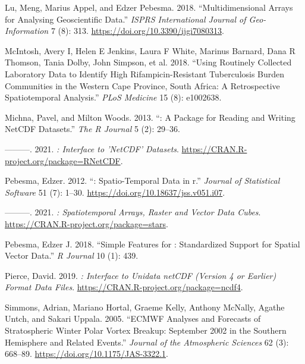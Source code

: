 \documentclass{article}
\newlength{\cslhangindent}
\newlength{\cslentryspacingunit} %
\newenvironment{CSLReferences}[2] %
 {%
  \setlength{\parindent}{0pt}
  \ifodd #1
  \let\oldpar\par
  \def\par{\hangindent=\cslhangindent\oldpar}
  \fi
  \setlength{\parskip}{#2\cslentryspacingunit}
 }%
 {}
\begin{document}
\begin{CSLReferences}{1}{0}
\leavevmode{}%
Lu, Meng, Marius Appel, and Edzer Pebesma. 2018. {``Multidimensional {Arrays} for {Analysing} {Geoscientific} {Data}.''} \emph{ISPRS International Journal of Geo-Information} 7 (8): 313. \url{https://doi.org/10.3390/ijgi7080313}.

\leavevmode{}%
McIntosh, Avery I, Helen E Jenkins, Laura F White, Marinus Barnard, Dana R Thomson, Tania Dolby, John Simpson, et al. 2018. {``Using Routinely Collected Laboratory Data to Identify High Rifampicin-Resistant Tuberculosis Burden Communities in the Western Cape Province, South Africa: A Retrospective Spatiotemporal Analysis.''} \emph{PLoS Medicine} 15 (8): e1002638.

\leavevmode{}%
Michna, Pavel, and Milton Woods. 2013. {``: A Package for Reading and Writing NetCDF Datasets.''} \emph{The R Journal} 5 (2): 29--36.

\leavevmode{}%
---------. 2021. \emph{: Interface to 'NetCDF' Datasets}. \url{https://CRAN.R-project.org/package=RNetCDF}.

\leavevmode{}%
Pebesma, Edzer. 2012. {``: Spatio-Temporal Data in r.''} \emph{Journal of Statistical Software} 51 (7): 1--30. \url{https://doi.org/10.18637/jss.v051.i07}.

\leavevmode{}%
---------. 2021. \emph{: Spatiotemporal Arrays, Raster and Vector Data Cubes}. \url{https://CRAN.R-project.org/package=stars}.

\leavevmode{}%
Pebesma, Edzer J. 2018. {``Simple Features for : Standardized Support for Spatial Vector Data.''} \emph{R Journal} 10 (1): 439.

\leavevmode{}%
Pierce, David. 2019. \emph{: Interface to Unidata netCDF (Version 4 or Earlier) Format Data Files}. \url{https://CRAN.R-project.org/package=ncdf4}.

\leavevmode{}%
Simmons, Adrian, Mariano Hortal, Graeme Kelly, Anthony McNally, Agathe Untch, and Sakari Uppala. 2005. {``ECMWF Analyses and Forecasts of Stratospheric Winter Polar Vortex Breakup: September 2002 in the Southern Hemisphere and Related Events.''} \emph{Journal of the Atmospheric Sciences} 62 (3): 668--89. \url{https://doi.org/10.1175/JAS-3322.1}.


\end{CSLReferences}
\end{document}

